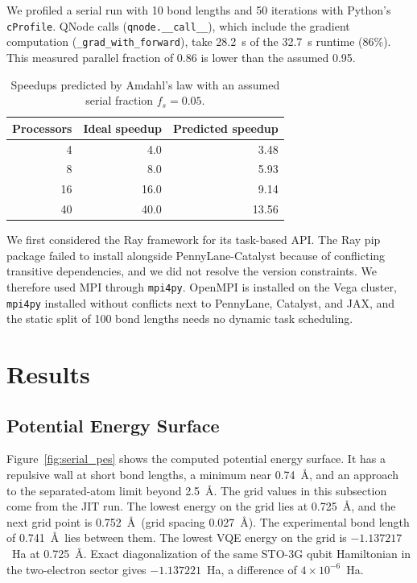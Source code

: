 \documentclass[11pt]{article}
\begin{document}
We profiled a serial run with 10 bond lengths and 50 iterations with Python's \texttt{cProfile}. QNode calls (\texttt{qnode.\_\_call\_\_}), which include the gradient computation (\texttt{\_grad\_with\_forward}), take 28.2~s of the 32.7~s runtime (86\%). This measured parallel fraction of 0.86 is lower than the assumed 0.95.

\begin{table}[t]
    \centering
    \small
    \begin{tabular}{rrr}
        \toprule
        Processors & Ideal speedup & Predicted speedup \\
        \midrule
        4  & 4.0  & 3.48  \\
        8  & 8.0  & 5.93  \\
        16 & 16.0 & 9.14  \\
        40 & 40.0 & 13.56 \\
        \bottomrule
    \end{tabular}
    \caption{Speedups predicted by Amdahl's law with an assumed serial fraction $f_s = 0.05$.}
    \label{tab:predictions}
\end{table}

We first considered the Ray framework for its task-based API. The Ray pip package failed to install alongside PennyLane-Catalyst because of conflicting transitive dependencies, and we did not resolve the version constraints. We therefore used MPI through \texttt{mpi4py}. OpenMPI is installed on the Vega cluster, \texttt{mpi4py} installed without conflicts next to PennyLane, Catalyst, and JAX, and the static split of 100 bond lengths needs no dynamic task scheduling.

\section{Results}
\label{sec:results}

\subsection{Potential Energy Surface}

Figure~\ref{fig:serial_pes} shows the computed potential energy surface. It has a repulsive wall at short bond lengths, a minimum near 0.74~\AA, and an approach to the separated-atom limit beyond 2.5~\AA. The grid values in this subsection come from the JIT run. The lowest energy on the grid lies at 0.725~\AA, and the next grid point is 0.752~\AA\ (grid spacing 0.027~\AA). The experimental bond length of 0.741~\AA\ lies between them. The lowest VQE energy on the grid is $-1.137217$~Ha at 0.725~\AA. Exact diagonalization of the same STO-3G qubit Hamiltonian in the two-electron sector gives $-1.137221$~Ha, a difference of $4\times10^{-6}$~Ha.
\end{document}
